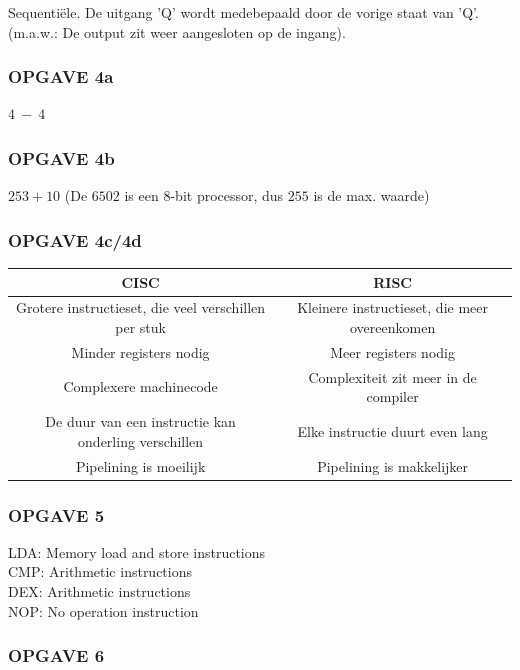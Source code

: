Sequentiële. De uitgang 'Q' wordt medebepaald door de vorige staat van 'Q'. (m.a.w.: De output zit weer aangesloten op de ingang).

\subsubsection{OPGAVE 4a}

$4\ -\ 4$

\subsubsection{OPGAVE 4b}

$253 + 10$ (De $6502$ is een $8$-bit processor, dus $255$ is de max. waarde)

\subsubsection{OPGAVE 4c/4d}

\hspace{-10mm}
\begin{tabular}[t]{|c|c|}
    \hline
    CISC & RISC \\
    \hline \hline
    Grotere instructieset, die veel verschillen per stuk & Kleinere instructieset, die meer overeenkomen \\
    Minder registers nodig & Meer registers nodig \\
    Complexere machinecode & Complexiteit zit meer in de compiler \\
    De duur van een instructie kan onderling verschillen & Elke instructie duurt even lang \\
    Pipelining is moeilijk & Pipelining is makkelijker \\
    \hline
\end{tabular}

\subsubsection{OPGAVE 5}

LDA: Memory load and store instructions \\
CMP: Arithmetic instructions \\
DEX: Arithmetic instructions \\
NOP: No operation instruction

\subsubsection{OPGAVE 6}


